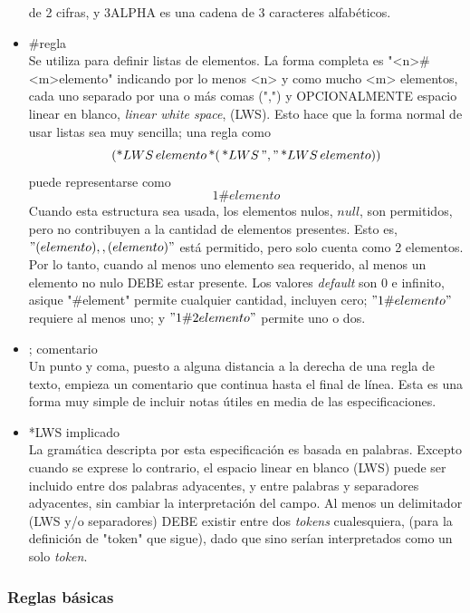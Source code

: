 \documentclass[a4paper,10pt]{article}
\begin{document}
\begin{itemize}
                de 2 cifras, y 3ALPHA es una cadena de 3 caracteres alfab\'eticos.
            \item \#regla\\
                Se utiliza para definir listas de elementos. La forma completa es "<n>\#<m>elemento" indicando por lo menos <n> y como mucho <m> elementos, cada uno
                separado por una o m\'as comas (",") y OPCIONALMENTE espacio linear en blanco, \textit{linear white space}, (LWS). Esto hace que la forma normal de usar listas 
                sea muy sencilla; una regla como\\
                \[( \text{*}LWS\,elemento\,\text{*}(\,\text{*}LWS\,","\,\text{*}LWS\,elemento ))\]
                puede representarse como\\
                \[1\#elemento\]
                Cuando esta estructura sea usada, los elementos nulos, $null$, son permitidos, pero no contribuyen a la cantidad de elementos presentes. Esto es, 
                $"(elemento), , (elemento) "$  est\'a permitido, pero solo cuenta como 2 elementos. Por lo tanto, cuando al menos uno elemento sea requerido, al menos un elemento
                no nulo DEBE estar presente. Los valores \textit{default} son $0$ e infinito, asique "\#element" permite cualquier cantidad, incluyen cero; $"1\#elemento"$ requiere
                al menos uno; y $"1\#2elemento"$ permite uno o dos.
            \item ; comentario\\
                Un punto y coma, puesto a alguna distancia a la derecha de una regla de texto, empieza un comentario que continua hasta el final de l\'inea. Esta es una forma muy
                simple de incluir notas \'utiles en media de las especificaciones.
            \item *LWS implicado\\
                La gram\'atica descripta por esta especificaci\'on es basada en palabras. Excepto cuando se exprese lo contrario, el espacio linear en blanco (LWS) puede ser 
                incluido entre dos palabras adyacentes, y entre palabras y separadores adyacentes, sin cambiar la interpretaci\'on del campo. Al menos un delimitador 
                (LWS y/o separadores) DEBE existir entre dos \textit{tokens} cualesquiera, (para la definici\'on de "token" que sigue), dado que sino ser\'ian interpretados 
                como un solo \textit{token}.        
        \end{itemize}

        \subsubsection{Reglas b\'asicas}
\end{document}
